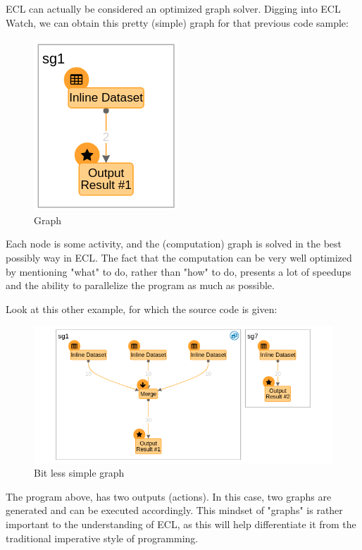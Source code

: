 \documentclass[a4paper,oneside,12pt]{book}
\begin{document}
ECL can actually be considered an optimized graph solver. Digging into ECL Watch, we can obtain this pretty (simple) graph for that previous code sample:
\begin{figure}[h]
    \centering
    \includegraphics[width=.4\linewidth]{../media/simplegraph}
    \caption{Graph}
\end{figure}

Each node is some activity, and the (computation) graph is solved in the best possibly way in ECL. The fact that the computation can be very well optimized by mentioning "what" to do, rather than "how" to do, presents a lot of speedups and the ability to parallelize the program as much as possible.

Look at this other example, for which the source code is given:



\begin{figure}[h]
    \centering
    \includegraphics[width=.7\linewidth]{../media/bitlesssimplegraph.png}
    \caption{Bit less simple graph}
\end{figure}

The program above, has two outputs (actions). In this case, two graphs are generated and can be executed accordingly. This mindset of "graphs" is rather important to the understanding of ECL, as this will help differentiate it from the traditional imperative style of programming.
\end{document}
